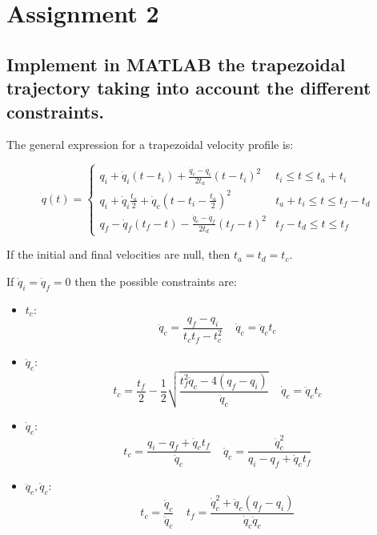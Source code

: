 \section{Assignment 2}

\subsection{Implement in MATLAB the trapezoidal trajectory taking into account the different constraints.}

The general expression for a trapezoidal velocity profile is:

\begin{equation*}
q(t)=\begin{cases}
q_i+\dot q_i(t-t_i)+\frac{\dot q_c-\dot q_i}{2t_a}(t-t_i)^2 & t_i\leq t\leq t_a+t_i\\
q_i+\dot q_i\frac{t_a}{2}+\dot q_c(t-t_i-\frac{t_a}{2})^2 & t_a+t_i\leq t\leq t_f-t_d\\
q_f-\dot q_f(t_f-t)-\frac{\dot q_c-\dot q_f}{2t_d}(t_f-t)^2 & t_f-t_d\leq t\leq t_f
\end{cases}
\end{equation*}

If the initial and final velocities are null, then $t_a=t_d=t_c$.

If $\dot q_i=\dot q_f=0$ then the possible constraints are:
\begin{itemize}
\item $t_c$:
\begin{equation*}
\ddot q_c = \frac{q_f-q_i}{t_ct_f-t_c^2}\;\;\;\;\dot q_c=\ddot q_ct_c
\end{equation*}
\item $\ddot q_c$:
\begin{equation*}
t_c=\frac{t_f}{2}-\frac{1}{2}\sqrt{\frac{t_f^2\ddot q_c-4(q_f-q_i)}{\ddot q_c}}\;\;\;\;\dot q_c=\ddot q_ct_c
\end{equation*}
\item $\dot q_c$:
\begin{equation*}
t_c=\frac{q_i-q_f+\dot q_ct_f}{\dot q_c}\;\;\;\;\ddot q_c = \frac{\dot q_c^2}{q_i-q_f+\dot q_ct_f}
\end{equation*}
\item $\ddot q_c,\dot q_c$:
\begin{equation*}
t_c=\frac{\dot q_c}{\ddot q_c}\;\;\;\;t_f=\frac{\dot q_c^2+\ddot q_c(q_f-q_i)}{\dot q_c\ddot q_c}
\end{equation*}
\end{itemize}

